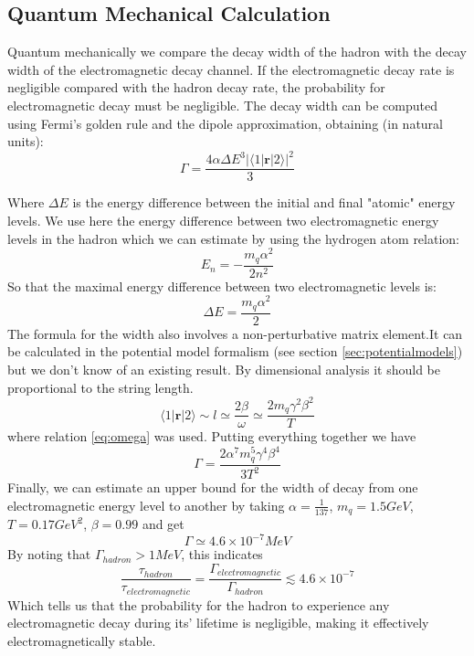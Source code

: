 \documentclass[11pt,a4paper]{article}
\begin{document}
\subsection{Quantum Mechanical Calculation}

Quantum mechanically we compare the decay width of the hadron with the decay width of the electromagnetic decay channel. If the electromagnetic decay rate is negligible compared with the hadron decay rate, the probability for electromagnetic decay must be negligible. The decay width can be computed using Fermi's golden rule and the dipole approximation, obtaining (in natural units):\cite{Scully97}
\begin{equation}
\Gamma=\frac{4\alpha\Delta E^3\vert\langle 1\vert \textbf{r} \vert 2\rangle\vert^2}{3}
\end{equation}

Where $\Delta E$ is the energy difference between the initial and final "atomic" energy levels. We use here the energy difference between two electromagnetic energy levels in the hadron which we can estimate by using the hydrogen atom relation:
\begin{equation}
E_n=-\frac{m_q \alpha^2}{2n^2}
\end{equation}
So that the maximal energy difference between two electromagnetic levels is:
\begin{equation}
\Delta E=\frac{m_q \alpha^2}{2}
\end{equation}
The formula for the width also involves a non-perturbative matrix element.It can be calculated in the potential model formalism (see section \ref{sec:potentialmodels}) but we don't know of an existing result. By dimensional analysis it should be proportional to the string length.
\begin{equation}
\langle 1\vert \textbf{r} \vert 2\rangle\sim l\simeq \frac{2\beta}{\omega} \simeq \frac{2m_q \gamma^2\beta^2}{T}
\end{equation}
where relation \ref{eq:omega} was used. Putting everything together we have
\begin{equation}
\Gamma=\frac{2\alpha^7 m_q^5 \gamma^4\beta^4}{3T^2}
\end{equation}
Finally, we can estimate an upper bound for the width of decay from one electromagnetic energy level to another by taking $\alpha=\frac{1}{137}$, $m_q=1.5 GeV$, $T=0.17 GeV^2$, $\beta=0.99$ and get
\begin{equation}
\Gamma\simeq 4.6\times 10^{-7} MeV
\end{equation}
By noting that $\Gamma_{hadron}>1 MeV$, this indicates
\begin{equation}
\frac{\tau_{hadron}}{\tau_{electromagnetic}}=\frac{\Gamma_{electromagnetic}}{\Gamma_{hadron}}\lesssim 4.6\times 10^{-7}
\end{equation}
Which tells us that the probability for the hadron to experience any electromagnetic decay during its' lifetime is negligible, making it effectively electromagnetically stable.
\end{document}
